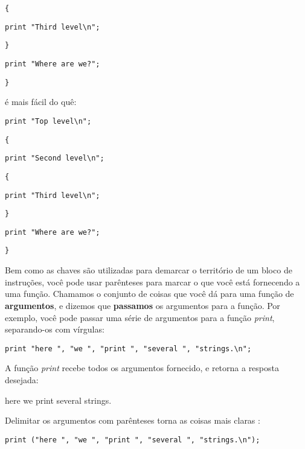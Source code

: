 \documentclass[a4paper,12pt,twoside]{book}
\begin{document}
\noindent \texttt{\{}

\noindent \texttt{print "Third level\textbackslash n";}

\noindent \texttt{\}}

\noindent \texttt{print "Where are we?";}

\noindent \texttt{\}}

\noindent 

\noindent é mais fácil do quê:

\noindent 

\noindent \texttt{print "Top level\textbackslash n";}

\noindent \texttt{\{}

\noindent \texttt{print "Second level\textbackslash n";}

\noindent \texttt{\{}

\noindent \texttt{print "Third level\textbackslash n";}

\noindent \texttt{\}}

\noindent \texttt{print "Where are we?";}

\noindent \texttt{\}}

\noindent 

\noindent Bem como as chaves são utilizadas para demarcar o território de um bloco de instruções, 
você pode usar parênteses para marcar o que você está fornecendo a uma função. 
Chamamos o conjunto de coisas que você dá para uma função de \textbf{argumentos}, 
e dizemos que \textbf{passamos} os argumentos para a função. Por exemplo, você pode 
passar uma série de argumentos para a função \textit{print}, separando-os 
com vírgulas:


\noindent 

\noindent \texttt{print "here ", "we ", "print ", "several ", "strings.\textbackslash n";}

\noindent 

\noindent A função \textit{print} recebe todos os argumentos fornecido, e retorna a resposta desejada:

\noindent 

\noindent here we print several strings.

\noindent 

\noindent Delimitar os argumentos com parênteses torna as coisas mais claras :

\noindent 

\noindent \texttt{print ("here ", "we ", "print ", "several ", "strings.\textbackslash n");}

\noindent 
\end{document}
